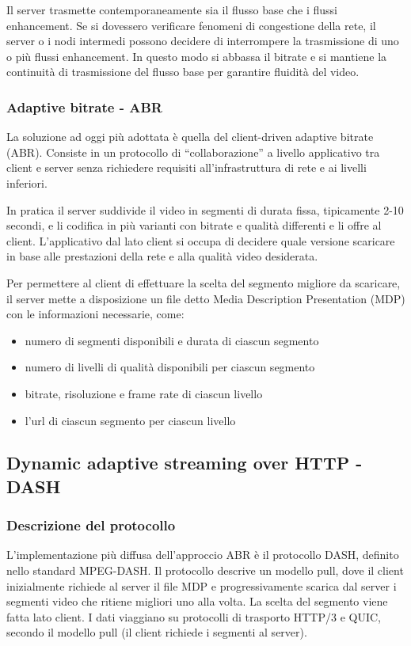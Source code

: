 Il server trasmette contemporaneamente sia il flusso base che i flussi enhancement. Se si dovessero verificare fenomeni
di congestione della rete, il server o i nodi intermedi possono decidere di interrompere la trasmissione di uno o più flussi
enhancement. In questo modo si abbassa il bitrate e si mantiene la continuità di trasmissione del flusso base per garantire
fluidità del video.

\subsubsection*{Adaptive bitrate - ABR}
La soluzione ad oggi più adottata è quella del client-driven adaptive bitrate (ABR). Consiste in un protocollo di
``collaborazione'' a livello applicativo tra client e server senza richiedere requisiti all'infrastruttura di rete
e ai livelli inferiori.

In pratica il server suddivide il video in segmenti di durata fissa, tipicamente 2-10 secondi, e li codifica in più varianti
con bitrate e qualità differenti e li offre al client. L'applicativo dal lato client si occupa di decidere quale versione
scaricare in base alle prestazioni della rete e alla qualità video desiderata.

Per permettere al client di effettuare la scelta del segmento migliore da scaricare, il server mette a disposizione
un file detto Media Description Presentation (MDP) con le informazioni necessarie, come:
\begin{itemize}
	\item numero di segmenti disponibili e durata di ciascun segmento
	\item numero di livelli di qualità disponibili per ciascun segmento
	\item bitrate, risoluzione e frame rate di ciascun livello
	\item l'url di ciascun segmento per ciascun livello
\end{itemize}

\subsection{Dynamic adaptive streaming over HTTP - DASH}
\subsubsection*{Descrizione del protocollo}
L'implementazione più diffusa dell'approccio ABR è il protocollo DASH, definito nello standard MPEG-DASH. Il protocollo
descrive un modello pull, dove il client inizialmente richiede al server il file MDP e progressivamente scarica dal server
i segmenti video che ritiene migliori uno alla volta. La scelta del segmento viene fatta lato client. I dati viaggiano
su protocolli di trasporto HTTP/3 e QUIC, secondo il modello pull (il client richiede i segmenti al server).

